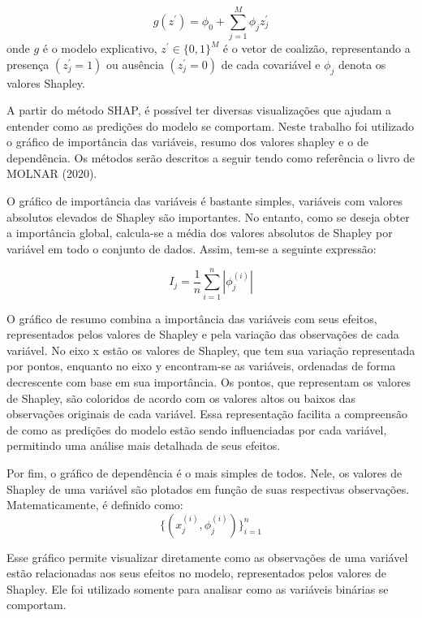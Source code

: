 \documentclass[
  12pt,
  a4paper,
]{scrreprt}
\begin{document}
\[
g\left(z^{'}\right) = \phi_0 + \sum_{j = 1}^{M} \phi_{j} z_{j}^{'}
\] onde \(g\) é o modelo explicativo, \(z^{'} \in \{0, 1\}^{M}\) é o
vetor de coalizão, representando a presença \(\left(z^{'}_j = 1\right)\)
ou ausência \(\left(z^{'}_j = 0\right)\) de cada covariável e \(\phi_j\)
denota os valores Shapley.

\vspace{12pt}

A partir do método SHAP, é possível ter diversas visualizações que
ajudam a entender como as predições do modelo se comportam. Neste
trabalho foi utilizado o gráfico de importância das variáveis, resumo
dos valores shapley e o de dependência. Os métodos serão descritos a
seguir tendo como referência o livro de MOLNAR (2020).

\vspace{12pt}

O gráfico de importância das variáveis é bastante simples, variáveis com
valores absolutos elevados de Shapley são importantes. No entanto, como
se deseja obter a importância global, calcula-se a média dos valores
absolutos de Shapley por variável em todo o conjunto de dados. Assim,
tem-se a seguinte expressão:

\[
I_j = \frac{1}{n}\sum^{n}_{i = 1} |\phi_j^{\left(i\right)}|
\]

O gráfico de resumo combina a importância das variáveis com seus
efeitos, representados pelos valores de Shapley e pela variação das
observações de cada variável. No eixo x estão os valores de Shapley, que
tem sua variação representada por pontos, enquanto no eixo y
encontram-se as variáveis, ordenadas de forma decrescente com base em
sua importância. Os pontos, que representam os valores de Shapley, são
coloridos de acordo com os valores altos ou baixos das observações
originais de cada variável. Essa representação facilita a compreensão de
como as predições do modelo estão sendo influenciadas por cada variável,
permitindo uma análise mais detalhada de seus efeitos.

\vspace{12pt}

Por fim, o gráfico de dependência é o mais simples de todos. Nele, os
valores de Shapley de uma variável são plotados em função de suas
respectivas observações. Matematicamente, é definido como: \[
\{\left(x_j^{\left(i\right)}, \phi_j^{\left(i\right)} \right)\}^{n}_{i=1}
\]

Esse gráfico permite visualizar diretamente como as observações de uma
variável estão relacionadas aos seus efeitos no modelo, representados
pelos valores de Shapley. Ele foi utilizado somente para analisar como
as variáveis binárias se comportam.
\end{document}
